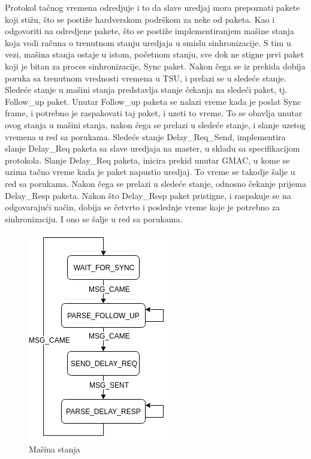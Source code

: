 \documentclass[a4paper,12pt, master]{etf}
\begin{document}
	Protokol ta\v{c}nog vremena odredjuje i to da slave uredjaj mora prepoznati
	pakete koji sti\v{z}u, \v{s}to se posti\v{z}e hardverskom podr\v{s}kom za
	neke od paketa. Kao i odgovoriti na odredjene pakete, \v{s}to se posti\v{z}e
	implementiranjem ma\v{s}ine stanja koja vodi ra\v{c}una o trenutnom stanju
	uredjaja u smislu sinhronizacije. S tim u vezi, ma\v{s}ina stanja ostaje u
	istom, po\v{c}etnom stanju, sve dok ne stigne prvi paket koji je bitan za
	proces sinhronizacije, Sync paket. Nakon \v{c}ega se iz prekida dobija
	poruka sa trenutnom vrednosti vremena u TSU, i prelazi se u slede\'{c}e
	stanje. Slede\'{c}e stanje u ma\v{s}ini stanja predstavlja stanje
	\v{c}ekanja na slede\'{c}i paket, tj. Follow\_up paket. Unutar Follow\_up
	paketa se nalazi vreme kada je poslat Sync frame, i potrebno je raspakovati
	taj paket, i uzeti to vreme. To se obavlja unutar ovog stanja u ma\v{s}ini
	stanja, nakon \v{c}ega se prelazi u slede\'{c}e stanje, i slanje uzetog
	vremena u red sa porukama. Slede\'{c}e stanje Delay\_Req\_Send,
	implementira slanje Delay\_Req paketa sa slave uredjaja na master, u skladu
	sa specifikacijom protokola. Slanje Delay\_Req paketa, inicira prekid
	unutar GMAC, u kome se uzima ta\v{c}no vreme kada je paket napustio
	uredjaj. To vreme se takodje \v{s}alje u red sa porukama. Nakon \v{c}ega se
	prelazi u slede\'{c}e stanje, odnosno \v{c}ekanje prijema Delay\_Resp
	paketa. Nakon \v{s}to Delay\_Resp paket pristigne, i raspakuje se na
	odgovaraju\'{c}i na\v{c}in, dobija se \v{c}etvrto i poslednje vreme koje je
	potrebno za sinhronizaciju. I ono se \v{s}alje u red sa porukama.

	\begin{figure}[h!]
			\centering
			\includegraphics[scale=.45]{../pic/state_machine.png}
            \caption{Ma\v{s}ina stanja}
			\label{fig:state_machine}
	\end{figure}
\end{document}
